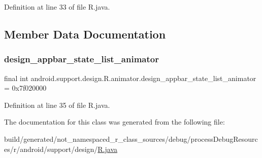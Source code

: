 Definition at line 33 of file R.\+java.


\begin{DoxyCode}{0}

\end{DoxyCode}


\subsection{Member Data Documentation}
\mbox{\label{classandroid_1_1support_1_1design_1_1_r_1_1animator_a2a7ecd7d450a8c927648ee2ed48886bf}} 
\subsubsection{\texorpdfstring{design\_appbar\_state\_list\_animator}{design\_appbar\_state\_list\_animator}}
{\footnotesize\ttfamily final int android.\+support.\+design.\+R.\+animator.\+design\+\_\+appbar\+\_\+state\+\_\+list\+\_\+animator = 0x7f020000\hspace{0.3cm}{\ttfamily [static]}}



Definition at line 35 of file R.\+java.



The documentation for this class was generated from the following file\+:\begin{DoxyCompactItemize}
\item 
build/generated/not\+\_\+namespaced\+\_\+r\+\_\+class\+\_\+sources/debug/process\+Debug\+Resources/r/android/support/design/\mbox{\hyperlink{android_2support_2design_2_r_8java}{R.\+java}}\end{DoxyCompactItemize}
